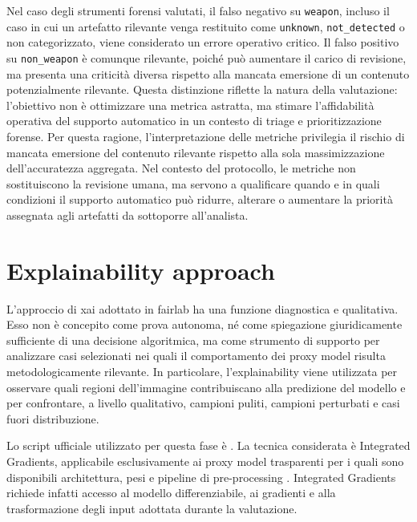 Nel caso degli strumenti forensi valutati, il falso negativo su \texttt{weapon}, incluso il
caso in cui un artefatto rilevante venga restituito come \texttt{unknown},
\texttt{not\_detected} o non categorizzato, viene considerato un errore
operativo critico. Il falso positivo su \texttt{non\_weapon} è comunque
rilevante, poiché può aumentare il carico di revisione, ma presenta una criticità
diversa rispetto alla mancata emersione di un contenuto potenzialmente rilevante.
Questa distinzione riflette la natura della valutazione: l'obiettivo non è
ottimizzare una metrica astratta, ma stimare l'affidabilità operativa del
supporto automatico in un contesto di triage e prioritizzazione forense.
Per questa ragione, l'interpretazione delle metriche privilegia il rischio di
mancata emersione del contenuto rilevante rispetto alla sola massimizzazione
dell'accuratezza aggregata. Nel contesto del protocollo, le metriche non
sostituiscono la revisione umana, ma servono a qualificare quando e in quali
condizioni il supporto automatico può ridurre, alterare o aumentare la priorità
assegnata agli artefatti da sottoporre all'analista.


\section{Explainability approach}
\label{sec:methodology-explainability}

L'approccio di \gls{xai} adottato in \gls{fairlab} ha una funzione diagnostica
e qualitativa. Esso non è concepito come prova autonoma, né come spiegazione
giuridicamente sufficiente di una decisione algoritmica, ma come strumento di
supporto per analizzare casi selezionati nei quali il comportamento dei proxy
model risulta metodologicamente rilevante. In particolare, l'explainability viene
utilizzata per osservare quali regioni dell'immagine contribuiscano alla
predizione del modello e per confrontare, a livello qualitativo, campioni puliti,
campioni perturbati e casi fuori distribuzione.

Lo script ufficiale utilizzato per questa fase è
.
La tecnica considerata è Integrated Gradients, applicabile esclusivamente ai
proxy model trasparenti per i quali sono disponibili architettura, pesi e
pipeline di pre-processing \cite{Sundararajan2017}. Integrated Gradients richiede
infatti accesso al modello differenziabile, ai gradienti e alla trasformazione
degli input adottata durante la valutazione.

